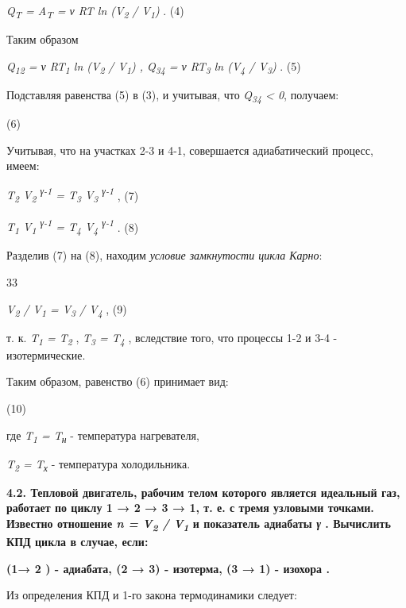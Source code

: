 \emph{Q\textsubscript{T} = A\textsubscript{T} = ν RT ln
(V\textsubscript{2} / V\textsubscript{1})} . (4)

Таким образом

\emph{Q\textsubscript{12} = ν RT\textsubscript{1} ln (V\textsubscript{2}
/ V\textsubscript{1}) , Q\textsubscript{34} = ν RT\textsubscript{3} ln
(V\textsubscript{4} / V\textsubscript{3})} . (5)

Подставляя равенства (5) в (3), и учитывая, что
\emph{Q\textsubscript{34} \textless{} 0}, получаем:

(6)

Учитывая, что на участках 2-3 и 4-1, совершается адиабатический процесс,
имеем:

\emph{T\textsubscript{2} V\textsubscript{2} \textsuperscript{γ-1} =
T\textsubscript{3} V\textsubscript{3} \textsuperscript{γ-1}} , (7)

\emph{T\textsubscript{1} V\textsubscript{1} \textsuperscript{γ-1} =
T\textsubscript{4} V\textsubscript{4} \textsuperscript{γ-1}} . (8)

Разделив (7) на (8), находим \emph{условие замкнутости цикла Карно}:

33

\emph{V\textsubscript{2} / V\textsubscript{1} = V\textsubscript{3} /
V\textsubscript{4}} , (9)

т. к. \emph{T\textsubscript{1} = T\textsubscript{2}} ,
\emph{T\textsubscript{3} = T\textsubscript{4}} , вследствие того, что
процессы 1-2 и 3-4 - изотермические.

Таким образом, равенство (6) принимает вид:

(10)

где \emph{T\textsubscript{1} = T\textsubscript{н}} - температура
нагревателя,

\emph{T\textsubscript{2} = T\textsubscript{х}} - температура
холодильника.

\textbf{4.2. Тепловой двигатель, рабочим телом которого является
идеальный газ, работает по циклу 1 → 2 → 3 → 1, т. е. с тремя узловыми
точками. Известно отношение \emph{n = V\textsubscript{2} /
V\textsubscript{1}} и показатель адиабаты \emph{γ} . Вычислить КПД цикла
в случае, если:}

\textbf{(1→ 2 ) - адиабата, (2 → 3) - изотерма, (3 → 1) - изохора .}

\solving{}

Из определения КПД и 1-го закона термодинамики следует:

